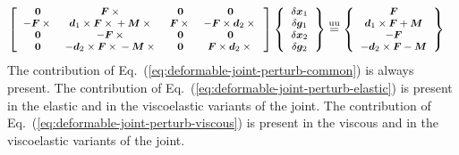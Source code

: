 \documentclass[10pt,fleqn,subeqn]{report}
\newcommand{\T}[1]{\bm{#1}}
\newcommand{\equu}{\overset{\text{uu}}{=}}
\begin{document}
\begin{align}
	\footnotesize
	\sqbr{\matr{cccc}{
		\T{0} & \T{F}\times{} & \T{0} & \T{0} \\
		- \T{F}\times{} & \T{d}_1\times\T{F}\times{} + \T{M}\times{} & \T{F}\times{} & - \T{F}\times\T{d}_2\times{} \\
		\T{0} & - \T{F}\times{} & \T{0} & \T{0} \\
		\T{0} & - \T{d}_2\times\T{F}\times{} - \T{M}\times{} & \T{0} & \T{F}\times\T{d}_2\times{}
	}} \cubr{\cvvect{
		\delta\T{x}_1 \\
		\delta\T{g}_1 \\
		\delta\T{x}_2 \\
		\delta\T{g}_2
	}}
%
%
%
	\equu \cubr{\cvvect{
		\T{F} \\
		\T{d}_1 \times \T{F} + \T{M} \\
		- \T{F} \\
		- \T{d}_2 \times \T{F} - \T{M}
	}} &
	\label{eq:deformable-joint-perturb-common}
\end{align}
The contribution of Eq.~(\ref{eq:deformable-joint-perturb-common})
is always present.
The contribution of Eq.~(\ref{eq:deformable-joint-perturb-elastic})
is present in the elastic and in the viscoelastic variants of the joint.
The contribution of Eq.~(\ref{eq:deformable-joint-perturb-viscous})
is present in the viscous and in the viscoelastic variants of the joint.
\end{document}
